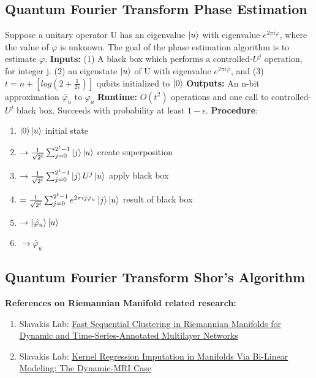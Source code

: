 \documentclass{article}
\begin{document}
\subsection*{Quantum Fourier Transform Phase Estimation}
Suppose a unitary operator U has an eigenvalue $\ket{u}$ with 
eigenvalue $e^{2 \pi i \varphi}$, where the value of 
$\varphi$ is unknown. The goal of the 
phase estimation algorithm is to estimate $\varphi$.
\newline
\textbf{Inputs:} (1) A black box which performs a 
controlled-$U^j$ operation, for integer j. (2) an 
eigenstate $\ket{u}$ of U with eigenvalue $e^{2 \pi i \varphi}$, and 
(3) $t = n + [log(2+\frac{1}{2 \epsilon})]$ qubits initialized 
to $\ket{0}$ \newline
\textbf{Outputs:} An n-bit approximation $\tilde{\varphi_u}$ to $\varphi_u$ \newline
\textbf{Runtime:} $O(t^2)$ operations and one call to controlled-$U^j$
black box. Succeeds with probability at least $1-\epsilon$. \newline
\textbf{Procedure}: 
\begin{enumerate}
  \item $\ket{0}\ket{u}$  initial state
  \item $\rightarrow \frac{1}{\sqrt{2^t}} \sum^{2^t -1}_{j=0} \ket{j}\ket{u} $ create superposition
  \item $\rightarrow \frac{1}{\sqrt{2^t}} \sum^{2^t -1}_{j=0} \ket{j} U^j \ket{u} $ apply black box
  \item $= \frac{1}{\sqrt{2^t}} \sum^{2^t -1}_{j=0}  e^{2 \pi i j \varphi_u} \ket{j} \ket{u} $ result of black box 
  \item $\rightarrow \ket{\tilde{\varphi_u}} \ket{u}$
  \item  $\rightarrow \tilde{\varphi_u}$
\end{enumerate}

\subsection*{Quantum Fourier Transform Shor's Algorithm}


\textbf{References on Riemannian Manifold related research:}
\begin{enumerate}
  \item Slavakis Lab: \href{https://ieeexplore.ieee.org/document/9321498}{Fast Sequential Clustering in Riemannian Manifolds 
  for Dynamic and Time-Series-Annotated Multilayer Networks}
  \item Slavakis Lab: \href{https://ieeexplore.ieee.org/document/9699419}{Kernel Regression Imputation in Manifolds Via Bi-Linear Modeling: 
  The Dynamic-MRI Case}
\end{enumerate}
\end{document}

